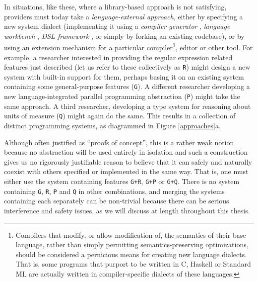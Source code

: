 In situations, like these, where a library-based approach is not satisfying, providers must today take a \emph{language-external approach}, either by specifying a new system dialect (implementing it using a \emph{compiler generator} \cite{brooker1963compiler}, \emph{language workbench} \cite{erdweg2013state}, \emph{DSL framework} \cite{fowler2010domain}, or simply by forking an existing codebase), or by using an extension mechanism for a {particular} compiler\footnote{Compilers that modify, or allow modification of, the semantics of their base language, rather than simply permitting semantics-preserving optimizations, should be considered a pernicious means for creating new language dialects. That is, some programs that purport to be written in C, Haskell or Standard ML are actually written in compiler-specific dialects of these languages.}, editor or other tool. For example, a researcher interested in providing the regular expression related features just described (let us refer to these collectively as \texttt{R}) might design a new system with built-in support for them, perhaps basing it on an existing system containing some general-purpose features (\texttt{G}). A different researcher developing a new language-integrated parallel programming abstraction (\texttt{P}) might  take the same approach. A third researcher, developing a type system for reasoning about units of measure (\texttt{Q}) might again do the same. This results in a collection of distinct programming systems, as diagrammed in Figure \ref{approaches}a. 

Although often justified as ``proofs of concept'', this is a rather weak notion because no abstraction will be used entirely in isolation and such a construction gives us no rigorously justifiable  reason to believe that it can safely and naturally coexist with others specified or implemented in the same way. That is, one must either use the system containing features \texttt{G+R}, \texttt{G+P} or \texttt{G+Q}. There is no system containing \texttt{G}, \texttt{R}, \texttt{P} and \texttt{Q} in other combinations, and merging the systems containing each separately can be non-trivial because there can be serious interference and safety issues, as we will discuss at length throughout this thesis.


